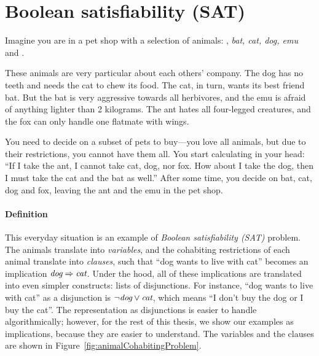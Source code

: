 \def\ant{\text{\em ant}}
\def\bat{\text{\em bat}}
\def\cat{\text{\em cat}}
\def\dog{\text{\em dog}}
\def\emu{\text{\em emu}}
\def\fox{\text{\em fox}}


\section{Boolean satisfiability (SAT)}
\label{sec:SAT-intro}

Imagine you are in a pet shop with a selection of animals: \ant, {\em bat, cat, dog, emu} and \fox.

These animals are very particular about each others' company. The dog has no teeth and needs the cat to chew its food. The cat, in turn, wants its best friend bat. 
But the bat is very aggressive towards all herbivores, and the emu is afraid of anything lighter than 2 kilograms. The ant hates all four-legged creatures, and the fox can only handle one flatmate with wings. 

You need to decide on a subset of pets to buy---you love all animals, but due to their restrictions, you cannot have them all. You start calculating in your head: ``If I take the ant, I cannot take cat, dog, nor fox. How about I take the dog, then I must take the cat and the bat as well.''
After some time, you decide on bat, cat, dog and fox, leaving the ant and the emu in the pet shop.

\paragraph{Definition}

This everyday situation is an example of \emph{Boolean satisfiability (SAT)} problem.
The animals translate into \emph{variables}, %
and the cohabiting restrictions of each animal translate into \emph{clauses},
such that ``dog wants to live with cat'' becomes an implication $\dog \Rightarrow \cat$.
Under the hood, all of these implications are translated into even simpler constructs: lists of disjunctions.
For instance, ``dog wants to live with cat'' as a disjunction is %
$\neg\dog \vee \cat{}$, which means ``I don't buy the dog or I buy the cat''.
The representation as disjunctions is easier to handle algorithmically; however,
for the rest of this thesis, we show our examples as implications, because they are easier to understand.
The variables and the clauses are shown in Figure~\ref{fig:animalCohabitingProblem}.


